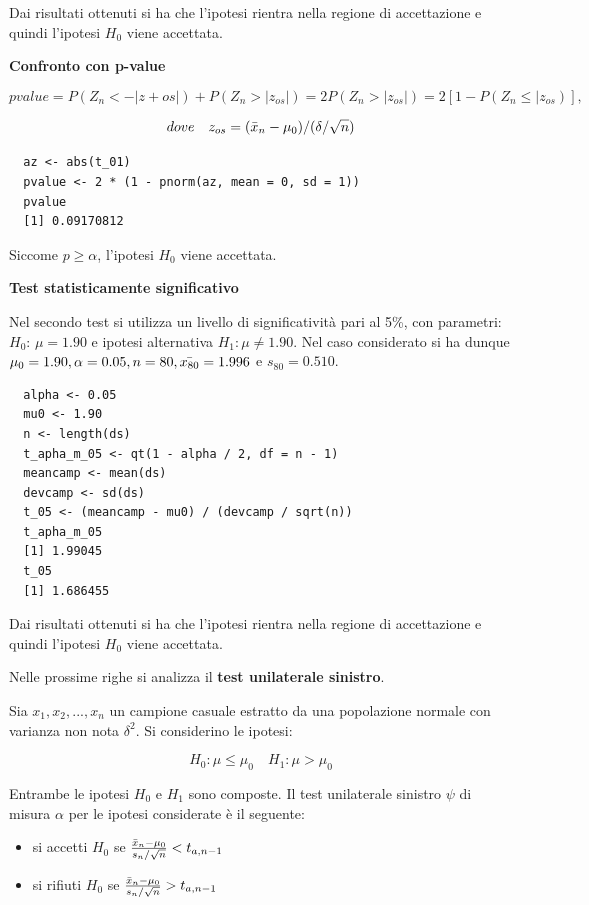 Dai risultati ottenuti si ha che l’ipotesi rientra nella regione di accettazione e quindi l’ipotesi $H_0$ viene accettata.

\vspace{5mm}
\noindent \textbf{Confronto con p-value}

\[pvalue = P(Z_n < -|z+{os}|) + P(Z_n > |z_{os}|) = 2P(Z_n>|z_{os}|) = 2[1-P(Z_n \leq |z_{os})],\]

\[dove \quad z_{os} = (\Bar{x}_n - \mu_0)/(\delta/\sqrt{n})\]

\begin{lstlisting}
  az <- abs(t_01)
  pvalue <- 2 * (1 - pnorm(az, mean = 0, sd = 1))
  pvalue
  [1] 0.09170812
\end{lstlisting}

Siccome $p \geq \alpha$, l'ipotesi $H_0$ viene accettata.

\vspace{5mm}
\noindent \textbf{Test statisticamente significativo}

Nel secondo test si utilizza un livello di significatività pari al 5\%, con parametri: $H_0$: $\mu = 1.90$ e ipotesi alternativa $H_1: \mu \neq 1.90$. Nel caso considerato si ha dunque $\mu_0 = 1.90, \alpha = 0.05, n = 80, \Bar{x_{80}} = 1.996$ e $s_{80} = 0.510$.

\vspace{5mm}
\begin{lstlisting}
  alpha <- 0.05
  mu0 <- 1.90
  n <- length(ds)
  t_apha_m_05 <- qt(1 - alpha / 2, df = n - 1)
  meancamp <- mean(ds)
  devcamp <- sd(ds)
  t_05 <- (meancamp - mu0) / (devcamp / sqrt(n))
  t_apha_m_05
  [1] 1.99045
  t_05
  [1] 1.686455
\end{lstlisting}

Dai risultati ottenuti si ha che l’ipotesi rientra nella regione di accettazione e quindi l’ipotesi $H_0$ viene accettata.

Nelle prossime righe si analizza il \textbf{test unilaterale sinistro}.

Sia $x_1, x_2, ..., x_n$ un campione casuale estratto da una popolazione normale con varianza non nota $\delta^2$. Si considerino le ipotesi:

\[H_0:\mu \leq \mu_0 \quad H_1:\mu > \mu_0\]

Entrambe le ipotesi $H_0$ e $H_1$ sono composte. Il test unilaterale sinistro $\psi$ di misura $\alpha$ per le ipotesi considerate è il seguente:

\begin{itemize}
    \item si accetti $H_0$ se $\frac{\Bar{x}_n - \mu_0}{s_n/\sqrt{n}} < t_{a,n-1}$
    \item si rifiuti $H_0$ se $\frac{\Bar{x}_n - \mu_0}{s_n/\sqrt{n}} > t_{a,n-1}$
\end{itemize}

